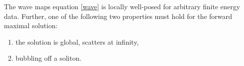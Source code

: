 \begin{theorem}
	The wave maps equation \eqref{wave} is locally well-posed for arbitrary finite energy data. Further, one of the following two properties must hold for the forward maximal solution:
	\begin{enumerate}
		\item the solution is global, scatters at infinity,
		\item bubbling off a soliton. 
	\end{enumerate}
\end{theorem}

